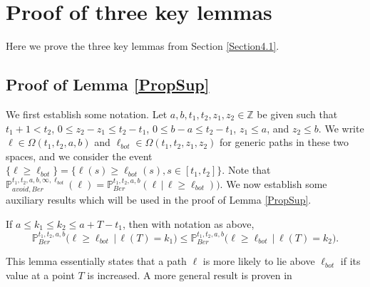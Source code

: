 
%
\section{Proof of three key lemmas}\label{Section5}
Here we prove the three key lemmas from Section \ref{Section4.1}.

\subsection{Proof of Lemma \ref{PropSup}}

We first establish some notation. Let $a,b,t_1,t_2,z_1,z_2 \in \mathbb{Z}$ be given such that $t_1 + 1 < t_2$, $0\leq z_2 - z_1 \leq t_2 - t_1$, $0\leq b-a \leq t_2 - t_1$, $z_1\leq a$, and $z_2\leq b$. We write $\ell\in\Omega(t_1,t_2,a,b)$ and $\ell_{bot}\in\Omega(t_1,t_2,z_1,z_2)$ for generic paths in these two spaces, and we consider the event $\{\ell \geq \ell_{bot}\} = \{\ell(s) \geq \ell_{bot}(s), s\in[t_1,t_2]\}$. Note that $\mathbb{P}^{t_1,t_2,a,b,\infty,\ell_{bot}}_{avoid,Ber}(\ell) = \mathbb{P}^{t_1,t_2,a,b}_{Ber}(\ell\,|\,\ell \geq \ell_{bot}))$. We now establish some auxiliary results which will be used in the proof of Lemma \ref{PropSup}.

\begin{lemma}\label{pathcounting}
	If $a\leq k_1\leq k_2\leq a + T - t_1$, then with notation as above,
	\[
	\mathbb{P}^{t_1, t_2, a, b}_{Ber}\big( \ell \geq \ell_{bot}\,\big|\,\ell(T) = k_1\big) \leq \mathbb{P}^{t_1, t_2, a, b}_{Ber}\big(\ell \geq \ell_{bot}\,\big|\,\ell(T) = k_2\big).
	\]
\end{lemma}

\begin{remark}
	This lemma essentially states that a path $\ell$ is more likely to lie above $\ell_{bot}$ if its value at a point $T$ is increased. A more general result is proven in \cite[Lemma 4.1]{CD}
\end{remark}

